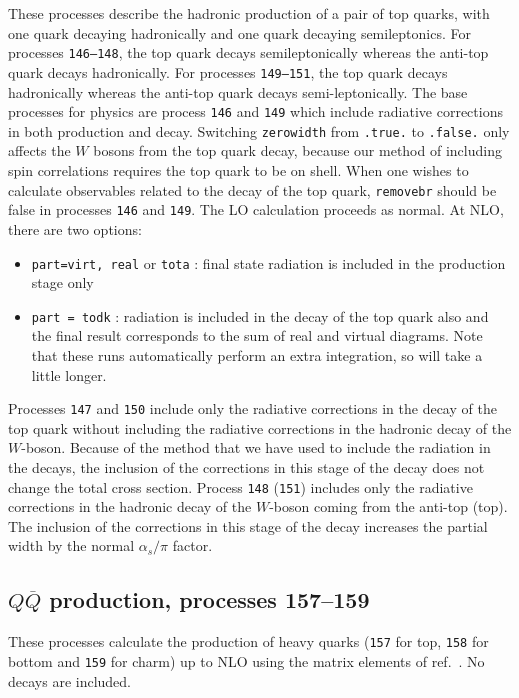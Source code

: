 \documentclass{article}
\begin{document}
{{{{{{These processes describe the hadronic production of a pair of top
quarks, with one quark decaying hadronically and one quark decaying
semileptonics.  For processes {\tt 146--148}, the top quark decays
semileptonically whereas the anti-top quark decays hadronically.  For
processes {\tt 149--151}, the top quark decays hadronically whereas the
anti-top quark decays semi-leptonically.  The base processes for
physics are process {\tt 146} and {\tt 149} which include
radiative corrections in both production and decay.  Switching {\tt zerowidth} from 
{\tt .true.} to {\tt .false.} only affects the $W$ bosons from the top
quark decay, because our method of including spin correlations
requires the top quark to be on shell.
When one wishes to calculate observables related to the decay of the top
quark, {\tt removebr} should be false in processes {\tt 146} and {\tt 149}.
The LO calculation proceeds as normal. At NLO, there are two options:
\begin{itemize}
\item {\tt part=virt, real} or {\tt tota} : final state radiation is included
in the production stage only
\item {\tt part = todk} : radiation is included in the decay of the top
quark also and the final result corresponds to the sum of real and virtual
diagrams. 
Note that these runs automatically perform an extra integration, so
will take a little longer.
\end{itemize}


Processes {\tt 147} and {\tt 150} include only the radiative 
corrections in the decay of the top quark without including 
the radiative corrections in the hadronic decay of the $W$-boson.
Because of the method that we have used to include the radiation in the decays,
the inclusion of the corrections in this stage of the decay does not change the
total cross section.
Process {\tt 148} ({\tt 151}) includes only the radiative corrections
in the hadronic decay of the $W$-boson coming from the anti-top (top).
The inclusion of the corrections in this stage of the decay increases the
partial width by the normal $\alpha_s/\pi$ factor.

\subsection{$Q\overline{Q}$ production, processes 157--159}
These processes calculate the production of heavy quarks
({\tt 157} for top, {\tt 158} for bottom and {\tt 159} for charm) up to NLO 
using the matrix elements of ref.~\cite{Nason:1987xz}. No decays
are included.

}}}}}}
\end{document}
